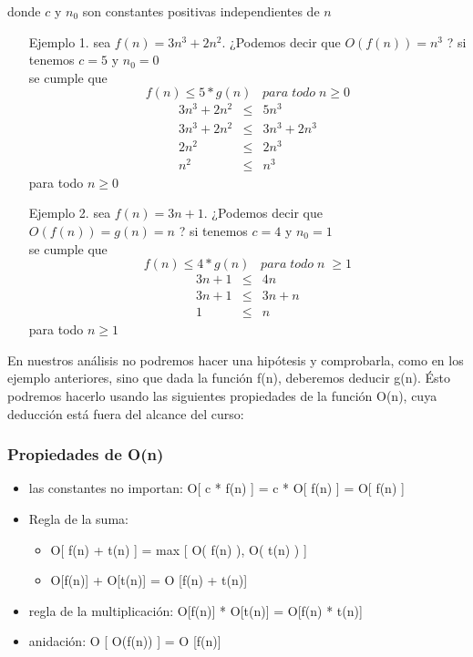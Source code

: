 donde $c$ y $n_0$ son constantes positivas independientes de $n$

\begin{itemize}
\item[Ejemplo 1. ]  sea $f(n) = 3n^3 + 2n^2 $.  ¿Podemos decir que
  $O(f(n) ) = n^3$ ?  si tenemos $c = 5$ y $n_0 = 0$\\

se cumple que
\[f(n) \leq 5 * g(n) \;\;\;para\; todo\; n \geq 0\]
\begin{eqnarray*}
  3n^3 + 2n^2  & \leq & 5n^3\\
 3n^3 + 2n^2  & \leq & 3n^3 + 2n^3\\
2n^2  & \leq & 2n^3\\
n^2  & \leq & n^3
\end{eqnarray*}
para todo $n \geq 0$
\item [Ejemplo 2. ]  sea $f(n) = 3n+ 1$.  ¿Podemos decir que $O(f(n) )
  = g(n) = n$ ? si tenemos $c = 4$ y $n_0 = 1$ \\

se cumple que
\[f(n) \leq 4*g(n) \;\;\;para \; todo \;n\; \geq 1\]
\begin{eqnarray*}
  3n+ 1 & \leq & 4n \\
  3n+ 1 & \leq & 3n + n \\
  1 & \leq & n
\end{eqnarray*}
 para todo $n \geq 1$
\end{itemize}

En nuestros análisis no podremos hacer una hipótesis y comprobarla,
como en los ejemplo anteriores, sino que dada la función f(n),
deberemos deducir g(n).  Ésto podremos hacerlo usando las siguientes
propiedades de la función O(n), cuya deducción está fuera del alcance
del curso:

\subsubsection{ Propiedades de O(n)}
\label{sec:propiedades-de-on}

\begin{itemize}
\item las constantes no importan: O[ c * f(n) ] = c * O[ f(n) ] = O[
  f(n) ]
\item Regla de la suma:
  \begin{itemize}
  \item O[ f(n) + t(n) ] = max [ O( f(n) ), O( t(n) ) ]
  \item O[f(n)] + O[t(n)] = O [f(n) + t(n)]
  \end{itemize}
\item regla de la multiplicación: O[f(n)] * O[t(n)] = O[f(n) * t(n)]
\item anidación: O [ O(f(n)) ] = O [f(n)]
\end{itemize}

